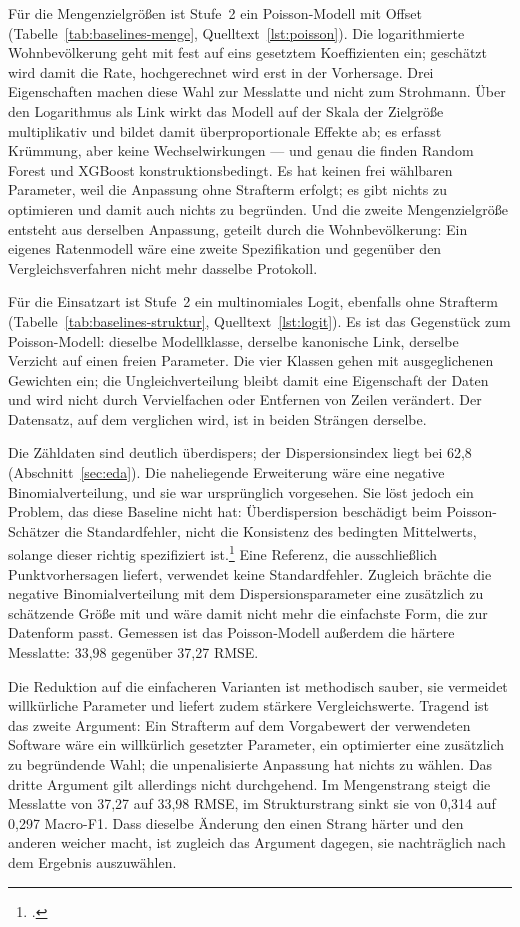 Für die Mengenzielgrößen ist Stufe~2 ein Poisson-Modell mit Offset
(Tabelle~\ref{tab:baselines-menge}, Quelltext~\ref{lst:poisson}). Die
logarithmierte Wohnbevölkerung geht mit fest auf eins gesetztem Koeffizienten
ein; geschätzt wird damit die Rate, hochgerechnet wird erst in der Vorhersage.
Drei Eigenschaften machen diese Wahl zur Messlatte und nicht zum Strohmann.
Über den Logarithmus als Link wirkt das Modell auf der Skala der Zielgröße
multiplikativ und bildet damit überproportionale Effekte ab; es erfasst
Krümmung, aber keine Wechselwirkungen --- und genau die finden Random Forest
und XGBoost konstruktionsbedingt. Es hat keinen frei wählbaren Parameter, weil
die Anpassung ohne Strafterm erfolgt; es gibt nichts zu optimieren und damit
auch nichts zu begründen. Und die zweite Mengenzielgröße entsteht aus derselben
Anpassung, geteilt durch die Wohnbevölkerung: Ein eigenes Ratenmodell wäre eine
zweite Spezifikation und gegenüber den Vergleichsverfahren nicht mehr dasselbe
Protokoll.

Für die Einsatzart ist Stufe~2 ein multinomiales Logit, ebenfalls ohne
Strafterm (Tabelle~\ref{tab:baselines-struktur},
Quelltext~\ref{lst:logit}). Es ist das Gegenstück zum Poisson-Modell: dieselbe
Modellklasse, derselbe kanonische Link, derselbe Verzicht auf einen freien
Parameter. Die vier Klassen gehen mit ausgeglichenen Gewichten ein; die
Ungleichverteilung bleibt damit eine Eigenschaft der Daten und wird nicht durch
Vervielfachen oder Entfernen von Zeilen verändert. Der Datensatz, auf dem
verglichen wird, ist in beiden Strängen derselbe.

Die Zähldaten sind deutlich überdispers; der Dispersionsindex liegt bei 62,8
(Abschnitt~\ref{sec:eda}). Die naheliegende Erweiterung wäre eine negative
Binomialverteilung, und sie war ursprünglich vorgesehen. Sie löst jedoch ein
Problem, das diese Baseline nicht hat: Überdispersion beschädigt beim
Poisson-Schätzer die Standardfehler, nicht die Konsistenz des bedingten
Mittelwerts, solange dieser richtig spezifiziert
ist.\footcite[5]{Gourieroux1981} Eine Referenz, die ausschließlich
Punktvorhersagen liefert, verwendet keine Standardfehler. Zugleich brächte die
negative Binomialverteilung mit dem Dispersionsparameter eine zusätzlich zu
schätzende Größe mit und wäre damit nicht mehr die einfachste Form, die zur
Datenform passt. Gemessen ist das Poisson-Modell außerdem die härtere
Messlatte: 33,98 gegenüber 37,27 RMSE.

Die Reduktion auf die einfacheren Varianten ist methodisch sauber, sie
vermeidet willkürliche Parameter und liefert zudem stärkere Vergleichswerte.
Tragend ist das zweite Argument: Ein Strafterm auf dem Vorgabewert der
verwendeten Software wäre ein willkürlich gesetzter Parameter, ein optimierter
eine zusätzlich zu begründende Wahl; die unpenalisierte Anpassung hat nichts zu
wählen. Das dritte Argument gilt allerdings nicht durchgehend. Im Mengenstrang
steigt die Messlatte von 37,27 auf 33,98 RMSE, im Strukturstrang sinkt sie von
0,314 auf 0,297 Macro-F1. Dass dieselbe Änderung den einen Strang härter und
den anderen weicher macht, ist zugleich das Argument dagegen, sie nachträglich
nach dem Ergebnis auszuwählen.

